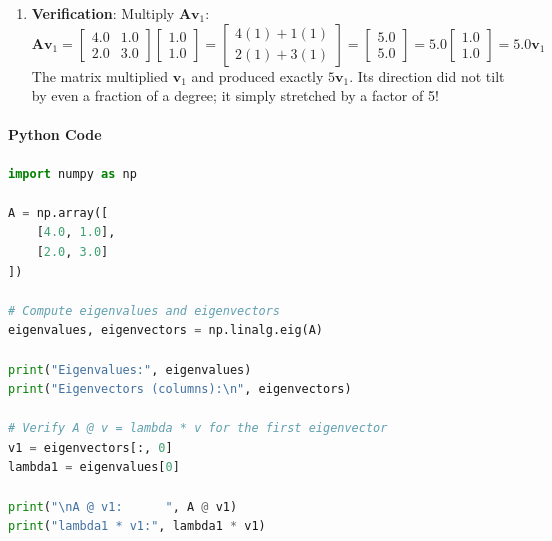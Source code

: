 \begin{enumerate}
\begin{equation*}
    \end{equation*}
    Both rows give the exact same equation: $-v_1 + v_2 = 0 \implies v_1 = v_2$.
    Setting $v_1 = 1.0$, our first eigenvector is $\mathbf{v}_1 = \begin{bmatrix} 1.0 \\ 1.0 \end{bmatrix}$.
    \item \textbf{Verification}: Multiply $\mathbf{A}\mathbf{v}_1$:
    \begin{equation*}
    \mathbf{A}\mathbf{v}_1 = \begin{bmatrix} 4.0 & 1.0 \\ 2.0 & 3.0 \end{bmatrix} \begin{bmatrix} 1.0 \\ 1.0 \end{bmatrix} = \begin{bmatrix} 4(1) + 1(1) \\ 2(1) + 3(1) \end{bmatrix} = \begin{bmatrix} 5.0 \\ 5.0 \end{bmatrix} = 5.0 \begin{bmatrix} 1.0 \\ 1.0 \end{bmatrix} = 5.0 \mathbf{v}_1
    \end{equation*}
    The matrix multiplied $\mathbf{v}_1$ and produced exactly $5\mathbf{v}_1$. Its direction did not tilt by even a fraction of a degree; it simply stretched by a factor of 5!
\end{enumerate}

\paragraph{Python Code}
\begin{lstlisting}[language=Python]
import numpy as np

A = np.array([
    [4.0, 1.0],
    [2.0, 3.0]
])

# Compute eigenvalues and eigenvectors
eigenvalues, eigenvectors = np.linalg.eig(A)

print("Eigenvalues:", eigenvalues)
print("Eigenvectors (columns):\n", eigenvectors)

# Verify A @ v = lambda * v for the first eigenvector
v1 = eigenvectors[:, 0]
lambda1 = eigenvalues[0]

print("\nA @ v1:      ", A @ v1)
print("lambda1 * v1:", lambda1 * v1)
\end{lstlisting}

